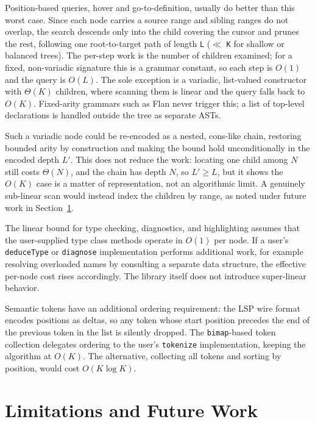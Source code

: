 Position-based queries, hover and go-to-definition, usually do better than this worst case.
Since each node carries a source range and sibling ranges do not overlap, the search descends only into the child covering the cursor and prunes the rest, following one root-to-target path of length \texttt{L} ($\ll$ \texttt{K} for shallow or balanced trees).
The per-step work is the number of children examined; for a fixed, non-variadic signature this is a grammar constant, so each step is $O(1)$ and the query is $O(L)$.
The sole exception is a variadic, list-valued constructor with $\Theta(K)$ children, where scanning them is linear and the query falls back to $O(K)$.
Fixed-arity grammars such as Flan never trigger this; a list of top-level declarations is handled outside the tree as separate ASTs.

Such a variadic node could be re-encoded as a nested, cons-like chain, restoring bounded arity by construction and making the bound hold unconditionally in the encoded depth $L'$.
This does not reduce the work: locating one child among $N$ still costs $\Theta(N)$, and the chain has depth $N$, so $L' \geq L$, but it shows the $O(K)$ case is a matter of representation, not an algorithmic limit. 
A genuinely sub-linear scan would instead index the children by range, as noted under future work in Section~\ref{sec:limitations}.

The linear bound for type checking, diagnostics, and highlighting assumes that the user-supplied type class methods operate in $O(1)$ per node.
If a user's \texttt{deduceType} or \texttt{diagnose} implementation performs additional work, for example resolving overloaded names by consulting a separate data structure, the effective per-node cost rises accordingly.
The library itself does not introduce super-linear behavior.

Semantic tokens have an additional ordering requirement: the LSP wire format encodes positions as deltas, so any token whose start position precedes the end of the previous token in the list is silently dropped.
The \texttt{bimap}-based token collection delegates ordering to the user's \texttt{tokenize} implementation, keeping the algorithm at $O(K)$.
The alternative, collecting all tokens and sorting by position, would cost $O(K \log K)$.

\section{Limitations and Future Work}
\label{sec:limitations}

